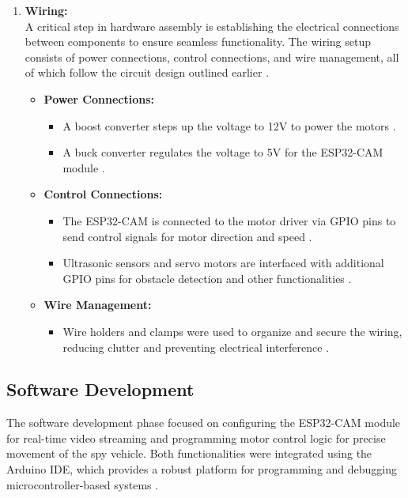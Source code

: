 \documentclass[12pt,a4paper]{report}
\begin{document}
\begin{enumerate}
    
    
\item \textbf{Wiring:} \\
A critical step in hardware assembly is establishing the electrical connections between components to ensure seamless functionality. The wiring setup consists of power connections, control connections, and wire management, all of which follow the circuit design outlined earlier \cite{iot, circuitdesign, robotsearch}.

\begin{itemize}
    \item \textbf{Power Connections:}
    \begin{itemize}
        \item A boost converter steps up the voltage to 12V to power the motors \cite{circuitdesign}.
        \item A buck converter regulates the voltage to 5V for the ESP32-CAM module \cite{circuitdesign}.
    \end{itemize}
    
    \item \textbf{Control Connections:}
    \begin{itemize}
        \item The ESP32-CAM is connected to the motor driver via GPIO pins to send control signals for motor direction and speed \cite{esp32cam}.
        \item Ultrasonic sensors and servo motors are interfaced with additional GPIO pins for obstacle detection and other functionalities \cite{iot, robotsearch}.
    \end{itemize}
    
    \item \textbf{Wire Management:}
    \begin{itemize}
        \item Wire holders and clamps were used to organize and secure the wiring, reducing clutter and preventing electrical interference \cite{robotsearch}.
    \end{itemize}
\end{itemize}



\end{enumerate}


\label{Software Development}
\subsection{Software Development}

The software development phase focused on configuring the ESP32-CAM module for real-time video streaming and programming motor control logic for precise movement of the spy vehicle. Both functionalities were integrated using the Arduino IDE, which provides a robust platform for programming and debugging microcontroller-based systems \cite{esp32cam}.
\end{document}
